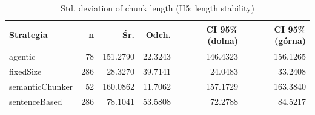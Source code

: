 \begin{table}[H]
    \centering
    \caption{Std. deviation of chunk length (H5: length stability)}
    \small
    \begin{tabular}{@{}lrrrrr@{}}
        \toprule
        \textbf{Strategia} & \textbf{n} & \textbf{Śr.} & \textbf{Odch.} & \textbf{CI 95\% (dolna)} & \textbf{CI 95\% (górna)} \\
        \midrule
        agentic & 78 & 151.2790 & 22.3243 & 146.4323 & 156.1265 \\
        fixedSize & 286 & 28.3270 & 39.7141 & 24.0483 & 33.2408 \\
        semanticChunker & 52 & 160.0862 & 11.7062 & 157.1729 & 163.3840 \\
        sentenceBased & 286 & 78.1041 & 53.5808 & 72.2788 & 84.5217 \\
        \bottomrule
    \end{tabular}
\end{table}
